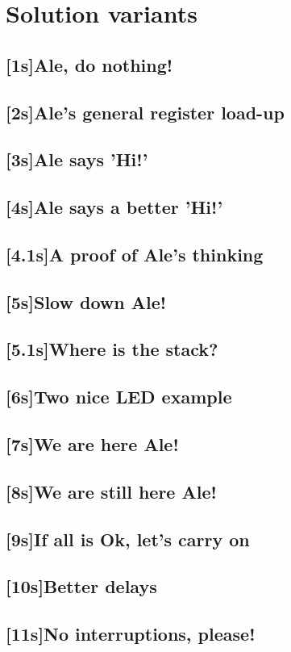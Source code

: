 \documentclass[12pt, a4paper]{book}
\begin{document}
\section{Solution variants}
\subsection{[1s]Ale, do nothing!}
\subsection{[2s]Ale's general register load-up}
\subsection{[3s]Ale says 'Hi!'}
\subsection{[4s]Ale says a better 'Hi!'}
\subsection{[4.1s]A proof of Ale's thinking}
\subsection{[5s]Slow down Ale!}
\subsection{[5.1s]Where is the stack?}
\subsection{[6s]Two nice LED example}
\subsection{[7s]We are here Ale!}
\subsection{[8s]We are still here Ale!}
\subsection{[9s]If all is Ok, let's carry on}
\subsection{[10s]Better delays}
\subsection{[11s]No interruptions, please!}
\end{document}
